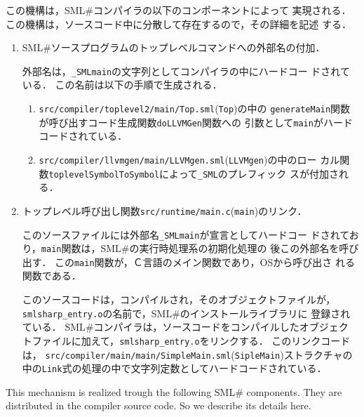 \documentclass{jbook}
\newcommand{\smlsharp}{SML\#}
\newcommand{\code}[1]{\mbox{\large\tt #1}}
\newcommand{\module}[2]{\code{#1}(\code{#2})}
\begin{document}
\ifjp%
	この機構は，\smlsharp{}コンパイラの以下のコンポーネントによって
実現される．
	この機構は，ソースコード中に分散して存在するので，その詳細を記述
する．
\begin{enumerate}
\item \smlsharp{}ソースプログラムのトップレベルコマンドへの外部名の付加．

	外部名は，\code{\_SMLmain}の文字列としてコンパイラの中にハードコー
ドされている．
	この名前は以下の手順で生成される．
\begin{enumerate}
\item \module{src/compiler/toplevel2/main/Top.sml}{Top}の中の
\code{generateMain}関数が呼び出すコード生成関数\code{doLLVMGen}関数への
引数として\code{main}がハードコードされている．
\item \module{src/compiler/llvmgen/main/LLVMgen.sml}{LLVMgen}の中のロー
カル関数\code{toplevelSymbolToSymbol}によって\code{\_SML}のプレフィック
スが付加される．
\end{enumerate}

\item トップレベル呼び出し関数\module{src/runtime/main.c}{main}のリンク．

	このソースファイルには外部名\code{\_SMLmain}が宣言としてハードコー
ドされており，\code{main}関数は，\smlsharp{}の実行時処理系の初期化処理の
後この外部名を呼び出す．
	この\code{main}関数が，Ｃ言語のメイン関数であり，OSから呼び出さ
れる関数である．

	このソースコードは，コンパイルされ，そのオブジェクトファイルが，
\code{smlsharp\_entry.o}の名前で，\smlsharp{}のインストールライブラリに
登録されている．
	\smlsharp{}コンパイラは，ソースコードをコンパイルしたオブジェク
トファイルに加えて，\code{smlsharp\_entry.o}をリンクする．
	このリンクコードは，
\module{src/compiler/main/main/SimpleMain.sml}{SipleMain}ストラクチャの
中の\code{Link}式の処理の中で文字列定数としてハードコードされている．
\end{enumerate}
\else%
	This mechanism is realized trough the following \smlsharp{}
components.
	They are distributed in the compiler source code.
	So we describe its details here.
\end{document}
